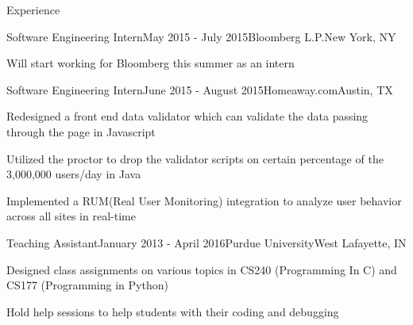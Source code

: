 \documentclass{resume} %
\begin{document}
\begin{rSection}{Experience}

\begin{rSubsection}{Software Engineering Intern}{May 2015 - July 2015}{Bloomberg L.P.}{New York, NY}
\item Will start working for Bloomberg this summer as an intern
\end{rSubsection}

\begin{rSubsection}{Software Engineering Intern}{June 2015 - August 2015}{Homeaway.com}{Austin, TX}
\item Redesigned a front end data validator which can validate the data passing through the page in Javascript
\item Utilized the proctor to drop the validator scripts on certain percentage of the 3,000,000 users/day in Java
\item Implemented a RUM(Real User Monitoring) integration to analyze user behavior across all sites in real-time  
\end{rSubsection}

\begin{rSubsection}{Teaching Assistant}{January 2013 - April 2016}{Purdue University}{West Lafayette, IN}
\item Designed class assignments on various topics in CS240 (Programming In C) and CS177 (Programming in Python) 
\item Hold help sessions to help students with their coding and debugging
\end{rSubsection}


\end{rSection}


\end{document}
